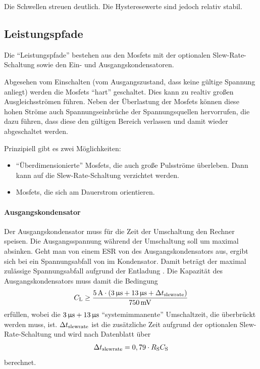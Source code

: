 Die Schwellen streuen \zT deutlich. Die Hysteresewerte sind jedoch relativ stabil.



\subsection{Leistungspfade}

Die "`Leistungspfade"' bestehen aus den Mosfets mit der optionalen Slew-Rate-Schaltung sowie den Ein- und Ausgangskondensatoren.

Abgesehen vom Einschalten (\dah vom Ausgangszustand, dass keine gültige Spannung anliegt) werden die Mosfets "`hart"' geschaltet. Dies kann zu realtiv großen Ausgleichsströmen führen. Neben der Überlastung der Mosfets können diese hohen Ströme auch Spannungseinbrüche der Spannungsquellen hervorrufen, die dazu führen, dass diese den gültigen Bereich verlassen und damit wieder abgeschaltet werden.



Prinzipiell gibt es zwei Möglichkeiten:
\begin{itemize}
	\item "`Überdimensionierte"' Mosfets, die auch große Pulsströme überleben. Dann kann auf die Slew-Rate-Schaltung verzichtet werden.
	\item Mosfets, die sich am Dauerstrom orientieren.
\end{itemize}



\paragraph{Ausgangskondensator}

Der Ausgangskondensator muss für die Zeit der Umschaltung den Rechner speisen. Die Ausgangsspannung während der Umschaltung soll um maximal  absinken. Geht man von einem ESR von  des Ausgangskondensators aus, ergibt sich bei  ein Spannungsabfall von  im Kondensator. Damit beträgt der maximal zulässige Spannungsabfall aufgrund der Entladung . Die Kapazität des Ausgangskondensators muss damit die Bedingung
\begin{align*}
	C_{\mathrm{L}} \geq \frac{5\,\mathrm{A} \cdot (3\,\mathrm{\upmu s} + 13\,\mathrm{\upmu s} + \Delta t_{\mathrm{slewrate}})}{750\,\mathrm{mV}}
\end{align*}
erfüllen, wobei die $3\,\mathrm{\upmu s} + 13\,\mathrm{\upmu s}$ "`systemimmanente"' Umschaltzeit, die überbrückt werden muss, ist. $\Delta t_{\mathrm{slewrate}}$ ist die zusätzliche Zeit aufgrund der optionalen Slew-Rate-Schaltung und wird nach Datenblatt über
\begin{align*}
	\Delta t_{\mathrm{slewrate}} = 0,79 \cdot R_{\mathrm{S}} C_{\mathrm{S}}
\end{align*}
berechnet.



